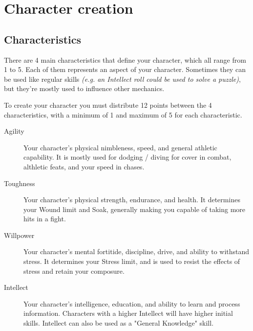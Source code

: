 \chapter{Character creation}

\section{Characteristics}


There are 4 main characteristics that define your character, which all range from 1 to 5. 
Each of them represents an aspect of your character. Sometimes they can be used like regular skills \textit{(e.g. an Intellect roll could be used to solve a puzzle)}, 
but they're mostly used to influence other mechanics. 

To create your character you must distribute 12 points between the 4 characteristics, 
with a minimum of 1 and maximum of 5 for each characteristic.

\begin{description}
    \item[Agility] 
    Your character's physical nimbleness, speed, and general athletic capability.
    It is mostly used for dodging / diving for cover in combat, althletic feats, and your speed in chases.

    \item[Toughness] 
    Your character's physical strength, endurance, and health.
    It determines your Wound limit and Soak, generally making you capable of taking more hits in a fight.

    \item[Willpower]
    Your character's mental fortitide, discipline, drive, and ability to withstand stress.
    It determines your Stress limit, and is used to resist the effects of stress and retain your composure.
    
    \item[Intellect]
    Your character's intelligence, education, and ability to learn and process information.
    Characters with a higher Intellect will have higher initial skills. 
    Intellect can also be used as a "General Knowledge" skill.
\end{description}


